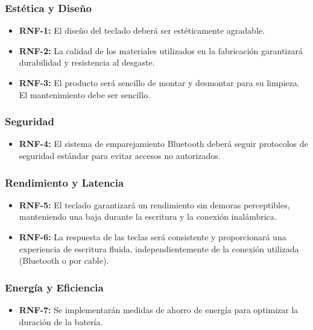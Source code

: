 \subsubsection{Estética y Diseño}
\begin{itemize}
\item \textbf{RNF-1:} El diseño del teclado deberá ser estéticamente agradable.
\item \textbf{RNF-2:} La calidad de los materiales utilizados en la fabricación garantizará durabilidad y resistencia al desgaste.
\item \textbf{RNF-3:} El producto será sencillo de montar y desmontar para su limpieza. El mantenimiento debe ser sencillo.
\end{itemize}

\subsubsection{Seguridad}
\begin{itemize}
\item \textbf{RNF-4:} El sistema de emparejamiento \gls{Bluetooth} deberá seguir protocolos de seguridad estándar para evitar accesos no autorizados.
\end{itemize}

\subsubsection{Rendimiento y \gls{Latencia}} \label{DiseñoRendimiento}
\begin{itemize}
\item \textbf{RNF-5:} El teclado garantizará un rendimiento sin demoras perceptibles, manteniendo una baja  durante la escritura y la conexión inalámbrica.
\item \textbf{RNF-6:} La respuesta de las teclas será consistente y proporcionará una experiencia de escritura fluida, independientemente de la conexión utilizada (\gls{Bluetooth} o por cable).
\end{itemize}

\subsubsection{Energía y Eficiencia} \label{DiseñoAhorroEnergia}
\begin{itemize}
\item \textbf{RNF-7:} Se implementarán medidas de ahorro de energía para optimizar la duración de la batería.
\end{itemize}

